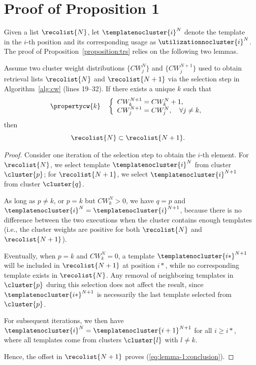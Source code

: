 \section{Proof of Proposition 1}
\label{sec:proof-trs-properties}

Given a list $\recolist{N}$, let $\templatenocluster{i}^{N}$ denote the template in the $i$-th position and its corresponding usage as $\utilizationnocluster{i}^{N}$. The proof of Proposition~\ref{proposition:trs} relies on the following two lemmas.

\begin{lemma}
Assume two cluster weight distributions $\{CW_j^{N}\}$ and $\{CW_j^{N+1}\}$ used to obtain retrieval lists $\recolist{N}$ and $\recolist{N+1}$ via the selection step in Algorithm~\ref{alg:cw} (lines 19--32). If there exists a unique $k$ such that
\begin{equation}
\propertycw{k} 
\quad
\left\{
\begin{array}{l}
    CW_{k}^{N+1} = CW_{k}^{N} + 1, \\
    CW_j^{N+1} = CW_j^{N}, \quad \forall j \neq k,
\end{array}
\right.
\end{equation}
then
\begin{equation}
\recolist{N} \subset \recolist{N+1}.
\label{eq:lemma-1:conclusion}
\end{equation}
\label{lemma:lemma-1}
\end{lemma}

\begin{proof}
Consider one iteration of the selection step to obtain the $i$-th element. For $\recolist{N}$, we select template $\templatenocluster{i}^{N}$ from cluster $\cluster{p}$; for $\recolist{N+1}$, we select $\templatenocluster{i}^{N+1}$ from cluster $\cluster{q}$.

As long as $p \neq k$, or $p = k$ but $CW_{k}^{N} > 0$, we have $q = p$ and $\templatenocluster{i}^{N} = \templatenocluster{i}^{N+1}$, because there is no difference between the two executions when the cluster contains enough templates (i.e., the cluster weights are positive for both $\recolist{N}$ and $\recolist{N+1}$). 

Eventually, when $p = k$ and $CW_{k}^{N} = 0$, a template $\templatenocluster{i*}^{N+1}$ will be included in $\recolist{N+1}$ at position $i*$, while no corresponding template exists in $\recolist{N}$. Any removal of neighboring templates in $\cluster{p}$ during this selection does not affect the result, since $\templatenocluster{i*}^{N+1}$ is necessarily the last template selected from $\cluster{p}$.

For subsequent iterations, we then have $\templatenocluster{i}^{N} = \templatenocluster{i+1}^{N+1}$ for all $i \ge i*$, where all templates come from clusters $\cluster{l}$ with $l \neq k$. 

Hence, the offset in $\recolist{N+1}$ proves (\ref{eq:lemma-1:conclusion}).
\end{proof}

